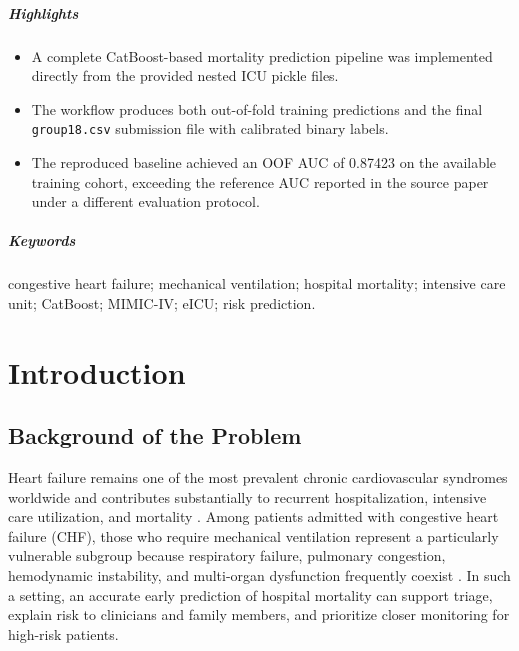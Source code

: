 \documentclass[a4paper,12pt]{extreport}
\begin{document}
\paragraph{Highlights}
\begin{itemize}[leftmargin=1.5em]
    \item A complete CatBoost-based mortality prediction pipeline was implemented directly from the provided nested ICU pickle files.
    \item The workflow produces both out-of-fold training predictions and the final \texttt{group18.csv} submission file with calibrated binary labels.
    \item The reproduced baseline achieved an OOF AUC of 0.87423 on the available training cohort, exceeding the reference AUC reported in the source paper under a different evaluation protocol.
\end{itemize}

\paragraph{Keywords}
congestive heart failure; mechanical ventilation; hospital mortality; intensive care unit; CatBoost; MIMIC-IV; eICU; risk prediction.

\tableofcontents
\newpage

\chapter{Introduction}

\section{Background of the Problem}
Heart failure remains one of the most prevalent chronic cardiovascular syndromes worldwide and contributes substantially to recurrent hospitalization, intensive care utilization, and mortality \cite{boorsma2020congestion}. Among patients admitted with congestive heart failure (CHF), those who require mechanical ventilation represent a particularly vulnerable subgroup because respiratory failure, pulmonary congestion, hemodynamic instability, and multi-organ dysfunction frequently coexist \cite{pham2017mechanical,damuth2015longterm}. In such a setting, an accurate early prediction of hospital mortality can support triage, explain risk to clinicians and family members, and prioritize closer monitoring for high-risk patients.
\end{document}
